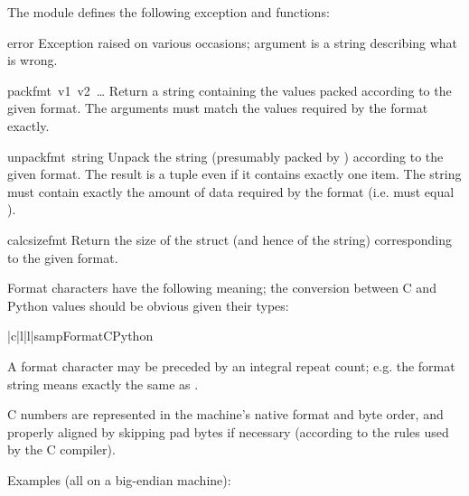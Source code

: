 The module defines the following exception and functions:

\renewcommand{\indexsubitem}{(in module struct)}
\begin{excdesc}{error}
  Exception raised on various occasions; argument is a string
  describing what is wrong.
\end{excdesc}

\begin{funcdesc}{pack}{fmt\, v1\, v2\, {\rm \ldots}}
  Return a string containing the values
   packed according to the given
  format.  The arguments must match the values required by the format
  exactly.
\end{funcdesc}

\begin{funcdesc}{unpack}{fmt\, string}
  Unpack the string (presumably packed by )
  according to the given format.  The result is a tuple even if it
  contains exactly one item.  The string must contain exactly the
  amount of data required by the format (i.e.   must
  equal ).
\end{funcdesc}

\begin{funcdesc}{calcsize}{fmt}
  Return the size of the struct (and hence of the string)
  corresponding to the given format.
\end{funcdesc}

Format characters have the following meaning; the conversion between C
and Python values should be obvious given their types:

\begin{tableiii}{|c|l|l|}{samp}{Format}{C}{Python}
\end{tableiii}

A format character may be preceded by an integral repeat count; e.g.
the format string  means exactly the same as .

C numbers are represented in the machine's native format and byte
order, and properly aligned by skipping pad bytes if necessary
(according to the rules used by the C compiler).

Examples (all on a big-endian machine):

